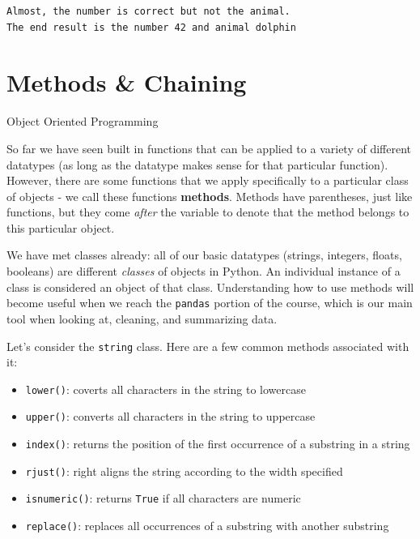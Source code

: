 \documentclass[
  letterpaper,
  DIV=11,
  numbers=noendperiod]{scrreprt}
\providecommand{\tightlist}{%
  \setlength{\itemsep}{0pt}\setlength{\parskip}{0pt}}\usepackage{longtable,booktabs,array}
\begin{document}
\begin{tcolorbox}[enhanced jigsaw, rightrule=.15mm, opacitybacktitle=0.6, colback=white, toprule=.15mm, colframe=quarto-callout-note-color-frame, bottomtitle=1mm, bottomrule=.15mm, arc=.35mm, coltitle=black, breakable, title={Solution to Challenge 5}, titlerule=0mm, opacityback=0, colbacktitle=quarto-callout-note-color!10!white, left=2mm, toptitle=1mm, leftrule=.75mm]

\begin{verbatim}
Almost, the number is correct but not the animal.
The end result is the number 42 and animal dolphin
\end{verbatim}

\end{tcolorbox}

\hypertarget{methods-chaining}{%
\section{Methods \& Chaining}\label{methods-chaining}}

Object Oriented Programming

So far we have seen built in functions that can be applied to a variety
of different datatypes (as long as the datatype makes sense for that
particular function). However, there are some functions that we apply
specifically to a particular class of objects - we call these functions
\textbf{methods}. Methods have parentheses, just like functions, but
they come \emph{after} the variable to denote that the method belongs to
this particular object.

We have met classes already: all of our basic datatypes (strings,
integers, floats, booleans) are different \emph{classes} of objects in
Python. An individual instance of a class is considered an object of
that class. Understanding how to use methods will become useful when we
reach the \texttt{pandas} portion of the course, which is our main tool
when looking at, cleaning, and summarizing data.

Let's consider the \texttt{string} class. Here are a few common methods
associated with it:

\begin{itemize}
\tightlist
\item
  \texttt{lower()}: coverts all characters in the string to lowercase
\item
  \texttt{upper()}: converts all characters in the string to uppercase
\item
  \texttt{index()}: returns the position of the first occurrence of a
  substring in a string
\item
  \texttt{rjust()}: right aligns the string according to the width
  specified
\item
  \texttt{isnumeric()}: returns \texttt{True} if all characters are
  numeric
\item
  \texttt{replace()}: replaces all occurrences of a substring with
  another substring
\end{itemize}
\end{document}
